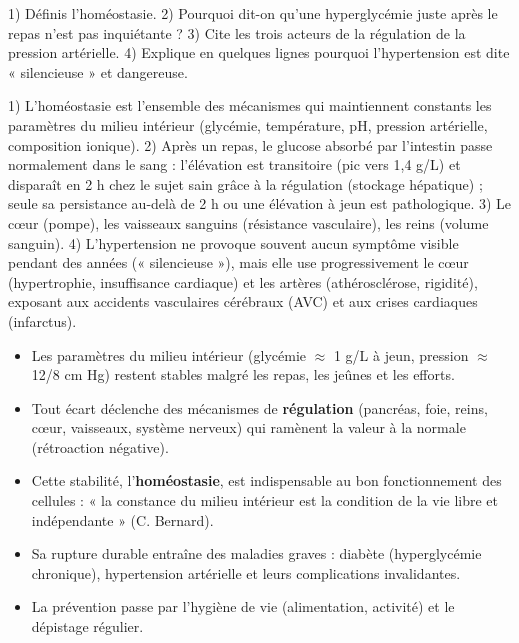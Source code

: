 \documentclass[11pt]{article}
\begin{document}
\begin{exercice}
1) Définis l'homéostasie. 2) Pourquoi dit-on qu'une hyperglycémie juste après le repas n'est pas inquiétante ? 3) Cite les trois acteurs de la régulation de la pression artérielle. 4) Explique en quelques lignes pourquoi l'hypertension est dite « silencieuse » et dangereuse.
\end{exercice}

\begin{corrige}[Exercice]
1) L'homéostasie est l'ensemble des mécanismes qui maintiennent constants les paramètres du milieu intérieur (glycémie, température, pH, pression artérielle, composition ionique). 2) Après un repas, le glucose absorbé par l'intestin passe normalement dans le sang : l'élévation est transitoire (pic vers 1,4 g/L) et disparaît en 2 h chez le sujet sain grâce à la régulation (stockage hépatique) ; seule sa persistance au-delà de 2 h ou une élévation à jeun est pathologique. 3) Le cœur (pompe), les vaisseaux sanguins (résistance vasculaire), les reins (volume sanguin). 4) L'hypertension ne provoque souvent aucun symptôme visible pendant des années (« silencieuse »), mais elle use progressivement le cœur (hypertrophie, insuffisance cardiaque) et les artères (athérosclérose, rigidité), exposant aux accidents vasculaires cérébraux (AVC) et aux crises cardiaques (infarctus).
\end{corrige}

\begin{aretenir}
\begin{itemize}
    \item Les paramètres du milieu intérieur (glycémie $\approx$ 1 g/L à jeun, pression $\approx$ 12/8 cm Hg) restent stables malgré les repas, les jeûnes et les efforts.
    \item Tout écart déclenche des mécanismes de \textbf{régulation} (pancréas, foie, reins, cœur, vaisseaux, système nerveux) qui ramènent la valeur à la normale (rétroaction négative).
    \item Cette stabilité, l'\textbf{homéostasie}, est indispensable au bon fonctionnement des cellules : « la constance du milieu intérieur est la condition de la vie libre et indépendante » (C. Bernard).
    \item Sa rupture durable entraîne des maladies graves : diabète (hyperglycémie chronique), hypertension artérielle et leurs complications invalidantes.
    \item La prévention passe par l'hygiène de vie (alimentation, activité) et le dépistage régulier.
\end{itemize}
\end{aretenir}
\end{document}
